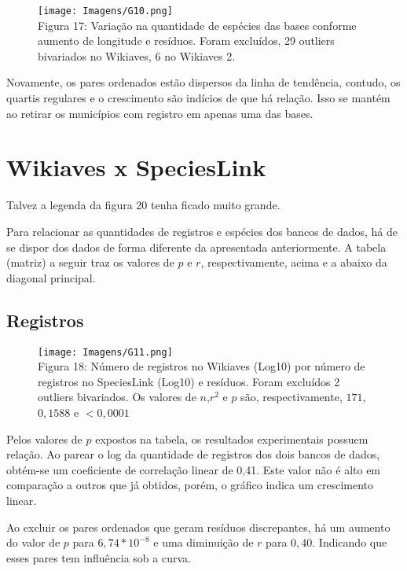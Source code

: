\documentclass[12pt]{extarticle}
\newenvironment{resposta}{ \color{mygray}}{}
\begin{document}
\begin{figure}[h!]
\centering
\texttt{[image: Imagens/G10.png]}
\\{\scriptsize Figura 17: Variação na quantidade de espécies das bases conforme aumento de longitude e resíduos. Foram excluídos, 29 outliers bivariados no Wikiaves, 6 no Wikiaves 2.}
\end{figure}

 \begin{resposta}
Novamente, os pares ordenados estão dispersos da linha de tendência, contudo, os quartis regulares e o crescimento são indícios de que há relação. Isso se mantém ao retirar os municípios com registro em apenas uma das bases.
\end{resposta}

\section{Wikiaves x SpeciesLink}

\hrulefill

Talvez a legenda da figura 20 tenha ficado muito grande.

\hrulefill


\begin{resposta}
Para relacionar as quantidades de registros e espécies dos bancos de dados, há de se dispor dos dados de forma diferente da apresentada anteriormente. A tabela (matriz) a seguir traz os valores de $p$ e $r$, respectivamente, acima e a abaixo da diagonal principal.
\end{resposta}

\newpage

\subsection{Registros}

\begin{figure}[h!]
\centering
\texttt{[image: Imagens/G11.png]}
\\{\scriptsize  Figura 18: Número de registros no Wikiaves (Log10) por número de registros no SpeciesLink (Log10) e resíduos. Foram excluídos 2 outliers bivariados. Os valores de $n$,$r^2$ e $p$ são, respectivamente, $171$, $0,1588$ e $<0,0001$}
\end{figure}

\begin{resposta}
Pelos valores de $p$ expostos na tabela, os resultados experimentais possuem relação. Ao parear o log da quantidade de registros dos dois bancos de dados, obtém-se um coeficiente de correlação linear de 0,41. Este valor não é alto em comparação a outros que já obtidos, porém, o gráfico indica um crescimento linear.

Ao excluir os pares ordenados que geram resíduos discrepantes, há um aumento do valor de $p$ para $6,74*10^{-8}$ e uma diminuição de $r$ para $0,40$. Indicando que esses pares tem influência sob a curva.
\end{resposta}
\end{document}
